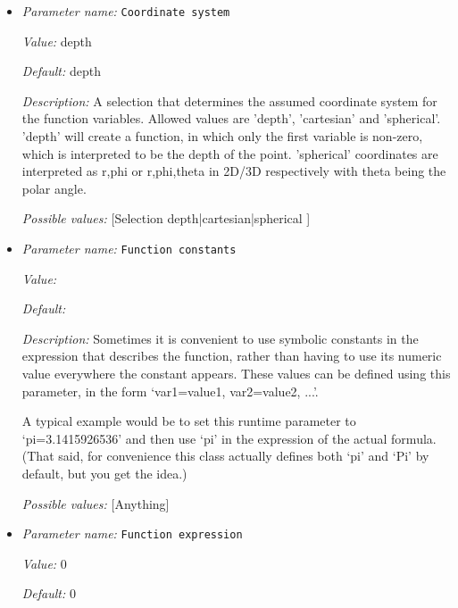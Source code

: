 \begin{itemize}
\item {\it Parameter name:} {\tt Coordinate system}
\label{parameters:Mesh refinement/Minimum refinement function/Coordinate system}


{\it Value:} depth


{\it Default:} depth


{\it Description:} A selection that determines the assumed coordinate system for the function variables. Allowed values are 'depth', 'cartesian' and 'spherical'. 'depth' will create a function, in which only the first variable is non-zero, which is interpreted to be the depth of the point. 'spherical' coordinates are interpreted as r,phi or r,phi,theta in 2D/3D respectively with theta being the polar angle.


{\it Possible values:} [Selection depth|cartesian|spherical ]
\item {\it Parameter name:} {\tt Function constants}
\label{parameters:Mesh refinement/Minimum refinement function/Function constants}


{\it Value:} 


{\it Default:} 


{\it Description:} Sometimes it is convenient to use symbolic constants in the expression that describes the function, rather than having to use its numeric value everywhere the constant appears. These values can be defined using this parameter, in the form `var1=value1, var2=value2, ...'.

A typical example would be to set this runtime parameter to `pi=3.1415926536' and then use `pi' in the expression of the actual formula. (That said, for convenience this class actually defines both `pi' and `Pi' by default, but you get the idea.)


{\it Possible values:} [Anything]
\item {\it Parameter name:} {\tt Function expression}
\label{parameters:Mesh refinement/Minimum refinement function/Function expression}


{\it Value:} 0


{\it Default:} 0



\end{itemize}

